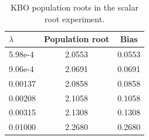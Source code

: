 \begin{table}[t]
\centering
\small
\setlength{\tabcolsep}{5pt}
\caption{KBO population roots in the scalar root experiment.}
\label{tab:generated-iv-root-kbo-population}
\begin{tabular}{lcc}
\toprule
$\lambda$ & Population root & Bias \\
\midrule
5.98e-4 & 2.0553 & 0.0553 \\
9.06e-4 & 2.0691 & 0.0691 \\
0.00137 & 2.0858 & 0.0858 \\
0.00208 & 2.1058 & 0.1058 \\
0.00315 & 2.1308 & 0.1308 \\
0.01000 & 2.2680 & 0.2680 \\
\bottomrule
\end{tabular}
\end{table}
